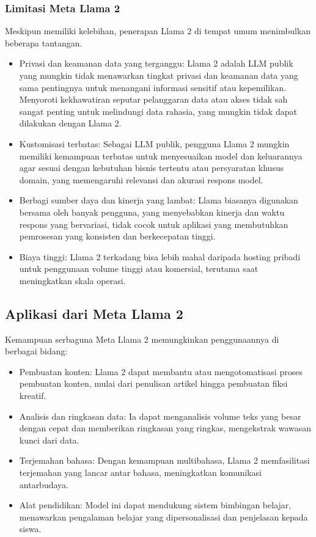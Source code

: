 \documentclass{article}
\begin{document}
\subsubsection{Limitasi Meta Llama 2}
Meskipun memiliki kelebihan, penerapan Llama 2 di tempat umum menimbulkan beberapa tantangan.
\begin{itemize}
    \item Privasi dan keamanan data yang terganggu: Llama 2 adalah LLM publik yang mungkin tidak menawarkan tingkat privasi dan keamanan data yang sama pentingnya untuk menangani informasi sensitif atau kepemilikan. Menyoroti kekhawatiran seputar pelanggaran data atau akses tidak sah sangat penting untuk melindungi data rahasia, yang mungkin tidak dapat dilakukan dengan Llama 2.
    \item Kustomisasi terbatas: Sebagai LLM publik, pengguna Llama 2 mungkin memiliki kemampuan terbatas untuk menyesuaikan model dan keluarannya agar sesuai dengan kebutuhan bisnis tertentu atau persyaratan khusus domain, yang memengaruhi relevansi dan akurasi respons model.
    \item Berbagi sumber daya dan kinerja yang lambat: Llama biasanya digunakan bersama oleh banyak pengguna, yang menyebabkan kinerja dan waktu respons yang bervariasi, tidak cocok untuk aplikasi yang membutuhkan pemrosesan yang konsisten dan berkecepatan tinggi.
    \item Biaya tinggi: Llama 2 terkadang bisa lebih mahal daripada hosting pribadi untuk penggunaan volume tinggi atau komersial, terutama saat meningkatkan skala operasi.
\end{itemize}

\subsection{Aplikasi dari Meta Llama 2}
Kemampuan serbaguna Meta Llama 2 memungkinkan penggunaannya di berbagai bidang:
\begin{itemize}
    \item Pembuatan konten: Llama 2 dapat membantu atau mengotomatisasi proses pembuatan konten, mulai dari penulisan artikel hingga pembuatan fiksi kreatif.
    \item Analisis dan ringkasan data: Ia dapat menganalisis volume teks yang besar dengan cepat dan memberikan ringkasan yang ringkas, mengekstrak wawasan kunci dari data.
    \item Terjemahan bahasa: Dengan kemampuan multibahasa, Llama 2 memfasilitasi terjemahan yang lancar antar bahasa, meningkatkan komunikasi antarbudaya.
    \item Alat pendidikan: Model ini dapat mendukung sistem bimbingan belajar, menawarkan pengalaman belajar yang dipersonalisasi dan penjelasan kepada siswa.
\end{itemize}
\end{document}
